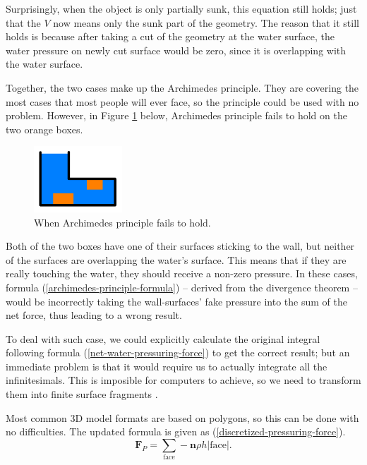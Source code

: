 Surprisingly, when the object is only partially sunk, this equation still holds;
just that the $V$ now means only the sunk part of the geometry.
The reason that it still holds is because after taking a cut of the geometry at the water surface, the water pressure on newly cut surface would be zero, since it is overlapping with the water surface.

Together, the two cases make up the Archimedes principle.
They are covering the most cases that most people will ever face, so the principle could be used with no problem.
However, in Figure \ref{archimedes-principle-failing-case} below, Archimedes principle fails to hold on the two orange boxes.

\begin{figure}[h]
	\begin{center}
		\includegraphics[width=1.3in]{figures/ap-blind-spot.png}
	\end{center}
	\caption{When Archimedes principle fails to hold.}
	\label{archimedes-principle-failing-case}
\end{figure}

Both of the two boxes have one of their surfaces sticking to the wall, but neither of the surfaces are overlapping the water's surface.
This means that if they are really touching the water, they should receive a non-zero pressure.
In these cases, formula (\ref{archimedes-principle-formula}) -- derived from the divergence theorem -- would be incorrectly taking the wall-surfaces' fake pressure into the sum of the net force, thus leading to a wrong result.

To deal with such case, we could explicitly calculate the original integral following formula (\ref{net-water-pressuring-force}) to get the correct result; but an immediate problem is that it would require us to actually integrate all the infinitesimals.
This is imposible for computers to achieve, so we need to transform them into finite surface fragments \cite{klosek1997integration}.

Most common 3D model formats are based on polygons, so this can be done with no difficulties.
The updated formula is given as (\ref{discretized-pressuring-force}).
\begin{equation}
	\mathbf{F}_P=\sum_{\text{face}}-\mathbf{n}\rho h|\text{face}|.
	\label{discretized-pressuring-force}
\end{equation}

